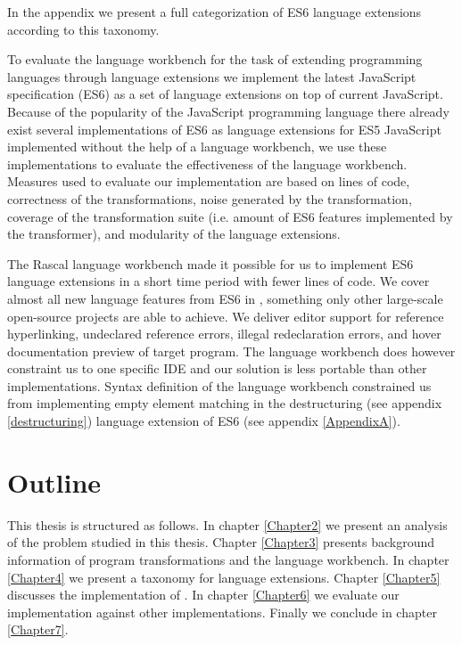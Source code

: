  In the appendix we present a full categorization of ES6 language extensions according to this taxonomy. 

To evaluate the language workbench for the task of extending programming languages through language extensions we implement the latest JavaScript specification (ES6) as a set of language extensions on top of current JavaScript. Because of the popularity of the JavaScript programming language there already exist several implementations of ES6 as language extensions for ES5 JavaScript implemented without the help of a language workbench, we use these implementations to evaluate the effectiveness of the language workbench.  
Measures used to evaluate our implementation are based on lines of code, correctness of the transformations, noise generated by the transformation, 
coverage of the transformation suite (i.e. amount of ES6 features implemented by the transformer), and modularity of the language extensions.

The Rascal language workbench made it possible for us to implement ES6 language extensions in a short time period with fewer lines of code. We cover almost all new language features from ES6 in \projectname, something only other large-scale open-source projects are able to achieve. We deliver editor support for reference hyperlinking, undeclared reference errors, illegal redeclaration errors, and hover documentation preview of target program. The language workbench does however constraint us to one specific IDE and our solution is less portable than other implementations. Syntax definition of the language workbench constrained us from implementing empty element matching in the destructuring (see appendix \ref{destructuring}) language extension of ES6 (see appendix \ref{AppendixA}).

\section{Outline}
This thesis is structured as follows. In chapter \ref{Chapter2} we present an analysis of the problem studied in this thesis. Chapter \ref{Chapter3} presents background information of program transformations and the language workbench. In chapter \ref{Chapter4} we present a taxonomy for language extensions.  Chapter \ref{Chapter5} discusses the implementation of \projectname. In chapter \ref{Chapter6} we evaluate our implementation against other implementations. Finally we conclude in chapter \ref{Chapter7}.
